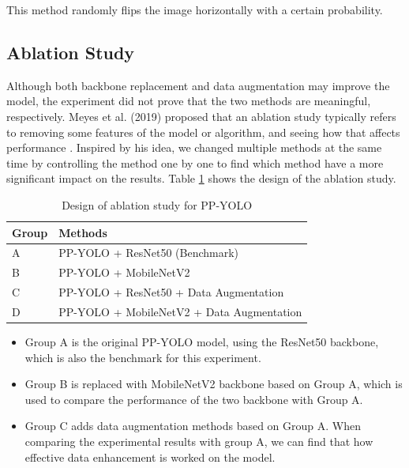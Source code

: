 \documentclass[sensors,article,submit,moreauthors,pdftex]{Definitions/mdpi}
\begin{document}
\begin{paracol}{2}
\begin{itemize}
\begin{itemize}
This method randomly flips the image horizontally with a certain probability.

\end{itemize}
\end{itemize}


\subsection{Ablation Study}
Although both backbone replacement and data augmentation may improve the model, the experiment did not prove that the two methods are meaningful, respectively. Meyes et al. (2019) proposed that an ablation study typically refers to removing some features of the model or algorithm, and seeing how that affects performance \cite{meyes2019ablation}.
Inspired by his idea, we changed multiple methods at the same time by controlling the method one by one to find which method have a more significant impact on the results. Table \ref{tbl:design of ablation study for PP-YOLO} shows the design of the ablation study.

\begin{table}[htbp]
\centering
\caption{Design of ablation study for PP-YOLO}
\begin{tabular}{ll} 
\toprule
\textbf{Group}&\textbf{Methods}\\
\midrule
A& PP-YOLO + ResNet50 (Benchmark) \\
\cmidrule(r){1-2}
B& PP-YOLO + MobileNetV2 \\
C& PP-YOLO + ResNet50 + Data Augmentation \\
D& PP-YOLO + MobileNetV2 + Data Augmentation\\
\bottomrule
\end{tabular}
\label{tbl:design of ablation study for PP-YOLO}
\end{table}


\begin{itemize}
\item{Group A is the original PP-YOLO model, using the ResNet50 backbone, which is also the benchmark for this experiment.}
\end{itemize}


\begin{itemize}
\item{Group B is replaced with MobileNetV2 backbone based on Group A, which is used to compare the performance of the two backbone with Group A.}
\end{itemize}

\begin{itemize}
\item{Group C adds data augmentation methods based on Group A. When comparing the experimental results with group A, we can find that how effective data enhancement is worked on the model.}
\end{itemize}


\end{paracol}
\end{document}

